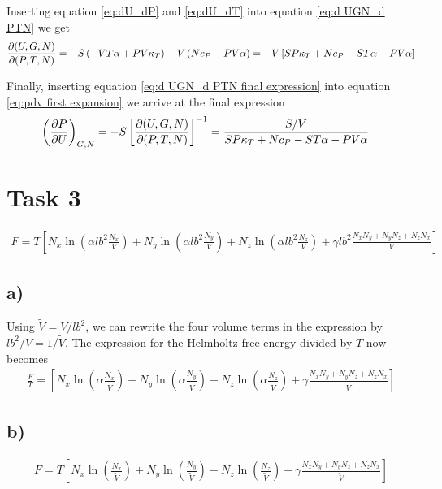\documentclass[reprint,english,notitlepage,aps,nobalancelastpage,nofootinbib]{revtex4-1}
\newcommand{\closed}[1]{\left(#1\right)}
\newcommand{\bracket}[1]{\left[#1\right]}
\newcommand{\kt}{\kappa_T}
\renewcommand{\cp}{c_P}
\renewcommand{\a}{\alpha}
\newcommand{\tmdv}[4]{\closed{\pdv{#1}{#2}}_{#3,#4}}
\newcommand{\jacobian}[2]{\pdv{(#1)}{(#2)}}
\newcommand{\nx}{N_x}
\newcommand{\ny}{N_y}
\newcommand{\nz}{N_z}
\begin{document}
Inserting equation \eqref{eq:dU_dP} and \eqref{eq:dU_dT} into equation \eqref{eq:d UGN_d PTN} we get 
\begin{align}
	\jacobian{U,G,N}{P,T,N} = -S \closed{-VT \a + PV\kt} - V \closed{N\cp - PV\a} = -V\bracket{SP\kt + N\cp -ST\a - PV\a} \label{eq:d UGN_d PTN final expression}
\end{align}

Finally, inserting equation \eqref{eq:d UGN_d PTN final expression} into equation \eqref{eq:pdv first expansion} we arrive at the final expression 
\begin{align}
	\tmdv{P}{U}{G}{N} &= -S \bracket{\jacobian{U,G,N}{P,T,N}}^{-1} = \frac{S/V}{SP\kt + N\cp -ST\a - PV\a}
\end{align}


\section*{\large Task 3}
 
\begin{align}
	F = T \bracket{N_x \ln\closed{\a l b^2 \frac{N_x}{{V}}} + N_y \ln\closed{\a l b^2 \frac{N_y}{{V}}} + N_z \ln\closed{\a l b^2 \frac{N_z}{{V}}} + \gamma l b^2 \frac{\nx\ny+\ny\nz+\nz\nx}{{V}} }
\end{align}

\subsection*{a)}
Using $\tilde{V}=V/lb^2$, we can rewrite the four volume terms in the expression by $lb^2/V=1/\tilde{V}$. The expression for the Helmholtz free energy divided by $T$ now becomes 
\begin{align}
	\frac{F}{T} = \bracket{N_x \ln\closed{\a  \frac{N_x}{\tilde{V}}} + N_y \ln\closed{\a  \frac{N_y}{\tilde{V}}} + N_z \ln\closed{\a  \frac{N_z}{\tilde{V}}} + \gamma \frac{\nx\ny+\ny\nz+\nz\nx}{\tilde{V}} }
\end{align}

\subsection*{b)}

\begin{align*}
	F = T \bracket{N_x \ln\closed{\frac{N_x}{\tilde{V}}} + N_y \ln\closed{\frac{N_y}{\tilde{V}}} + N_z \ln\closed{\frac{N_z}{\tilde{V}}} + \gamma \frac{\nx\ny+\ny\nz+\nz\nx}{\tilde{V}} }
\end{align*}
\end{document}
